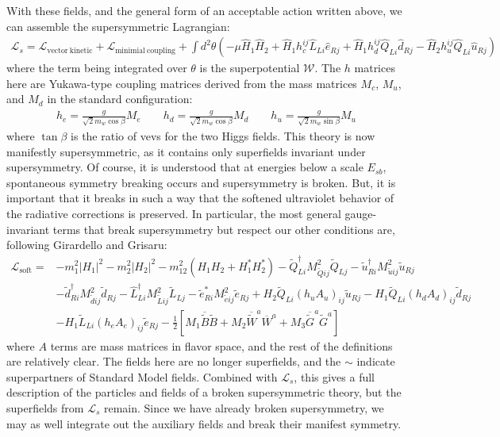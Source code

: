With these fields, and the general form of an acceptable action written above, we can assemble the supersymmetric Lagrangian:
\begin{align}
  \mathcal{L}_s = \mathcal{L}_\mathrm{vector~kinetic} + \mathcal{L}_\mathrm{minimial~coupling} + \int d^2\theta \left( -\mu \hat{H}_1 \hat{H}_2 + \hat{H}_1 h_c^{ij}\hat{L}_{Li} \hat{e}_{Rj} + \hat{H}_1 h^{ij}_d \hat{Q}_{Li} \hat{d}_{Rj} - \hat{H}_2 h^{ij}_u \hat{Q}_{Li} \hat{u}_{Rj} \right)
\end{align}
where the term being integrated over $\theta$ is the superpotential $\mathcal{W}$. The $h$ matrices here are Yukawa-type coupling matrices derived from the mass matrices $M_c$, $M_u$, and $M_d$ in the standard configuration:
\begin{align}
  h_e = \frac{g}{\sqrt{2} m_w \cos{\beta}}M_e\quad \quad h_d = \frac{g}{\sqrt{2} m_w \cos{\beta}}M_d \quad \quad h_u = \frac{g}{\sqrt{2} m_w \sin{\beta}}M_u
\end{align}
where $\tan{\beta}$ is the ratio of vevs for the two Higgs fields. This theory is now manifestly supersymmetric, as it contains only superfields invariant under supersymmetry. Of course, it is understood that at energies below a scale $E_{sb}$, spontaneous symmetry breaking occurs and supersymmetry is broken. But, it is important that it breaks in such a way that the softened ultraviolet behavior of the radiative corrections is preserved. In particular, the most general gauge-invariant terms that break supersymmetry but respect our other conditions are, following Girardello and Grisaru: \cite[p.~346]{Jungman}
\begin{align}
  \mathcal{L}_\mathrm{soft} = &-m_1^2 |H_1|^2 - m_2^2 |H_2|^2 - m_{12}^2 \left( H_1 H_2 + H_1^* H_2^* \right) - \tilde{Q}_{Li}^\dagger M_{\tilde{Q} ij}^2 \tilde{Q}_{Lj} - \tilde{u}^\dagger_{Ri} M^2_{\tilde{u} i j} \tilde{u}_{Rj}\nonumber\\
  &-\tilde{d}_{Ri}^\dagger M^2_{\tilde{d} i j} \tilde{d}_{Rj} -\hat{L}^\dagger_{Li} M^2_{\tilde{L} ij} \tilde{L}_{Lj} - \tilde{e}^*_{Ri} M^2_{\tilde{e} ij} \tilde{e}_{Rj} + H_2 \tilde{Q}_{Li}(h_u A_u)_{ij} \tilde{u}_{Rj} -H_1 \tilde{Q}_{Li} (h_d A_d)_{ij} \tilde{d}_{Rj}\nonumber\\
  &-H_1 \tilde{L}_{Li} (h_e A_e)_{ij} \tilde{e}_{Rj} - \frac{1}{2} \left[ M_1 \overline{\tilde{B}} \tilde{B} + M_2 \overline{\tilde{W}}^a \overline{W}^a + M_3 \overline{\tilde{G}}^a \tilde{G}^a \right]
\end{align}
where $A$ terms are mass matrices in flavor space, and the rest of the definitions are relatively clear. The fields here are no longer superfields, and the $\sim$ indicate superpartners of Standard Model fields. Combined with $\mathcal{L}_s$, this gives a full description of the particles and fields of a broken supersymmetric theory, but the superfields from $\mathcal{L}_s$ remain. Since we have already broken supersymmetry, we may as well integrate out the auxiliary fields and break their manifest symmetry.

